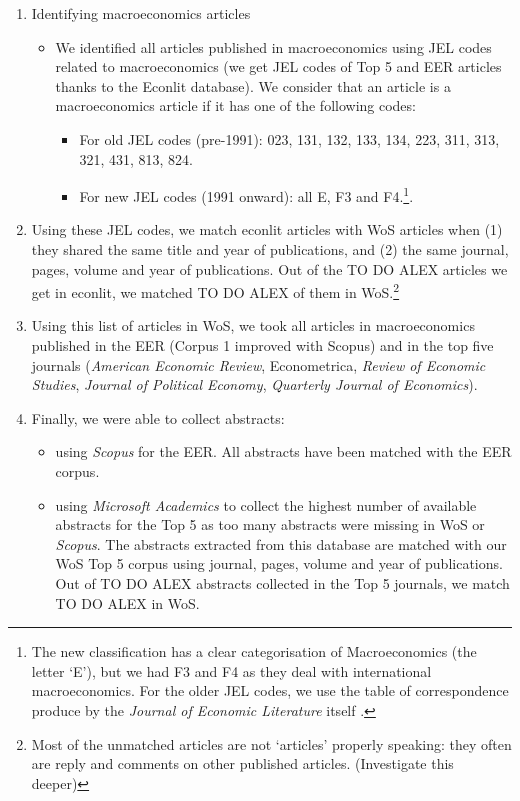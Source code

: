 \documentclass[]{elsarticle} %
\providecommand{\tightlist}{%
  \setlength{\itemsep}{0pt}\setlength{\parskip}{0pt}}
\begin{document}
\begin{enumerate}
\def\labelenumi{\arabic{enumi}.}
\item
  Identifying macroeconomics articles

  \begin{itemize}
  \item
    We identified all articles published in macroeconomics using JEL
    codes related to macroeconomics (we get JEL codes of Top 5 and EER
    articles thanks to the Econlit database). We consider that an
    article is a macroeconomics article if it has one of the following
    codes:

    \begin{itemize}
    \tightlist
    \item
      For old JEL codes (pre-1991): 023, 131, 132, 133, 134, 223, 311,
      313, 321, 431, 813, 824.
    \item
      For new JEL codes (1991 onward): all E, F3 and F4.\footnote{The
        new classification has a clear categorisation of Macroeconomics
        (the letter `E'), but we had F3 and F4 as they deal with
        international macroeconomics. For the older JEL codes, we use
        the table of correspondence produce by the \emph{Journal of
        Economic Literature} itself \citep{jel1991}.}.
    \end{itemize}
  \end{itemize}
\item
  Using these JEL codes, we match econlit articles with WoS articles
  when (1) they shared the same title and year of publications, and (2)
  the same journal, pages, volume and year of publications. Out of the
  TO DO ALEX articles we get in econlit, we matched TO DO ALEX of them
  in WoS.\footnote{Most of the unmatched articles are not `articles'
    properly speaking: they often are reply and comments on other
    published articles. (Investigate this deeper)}
\item
  Using this list of articles in WoS, we took all articles in
  macroeconomics published in the EER (Corpus 1 improved with Scopus)
  and in the top five journals (\emph{American Economic Review},
  Econometrica, \emph{Review of Economic Studies}, \emph{Journal of
  Political Economy}, \emph{Quarterly Journal of Economics}).
\item
  Finally, we were able to collect abstracts:

  \begin{itemize}
  \tightlist
  \item
    using \emph{Scopus} for the EER. All abstracts have been matched
    with the EER corpus.
  \item
    using \emph{Microsoft Academics} to collect the highest number of
    available abstracts for the Top 5 as too many abstracts were missing
    in WoS or \emph{Scopus}. The abstracts extracted from this database
    are matched with our WoS Top 5 corpus using journal, pages, volume
    and year of publications. Out of TO DO ALEX abstracts collected in
    the Top 5 journals, we match TO DO ALEX in WoS.
  \end{itemize}
\end{enumerate}
\end{document}
